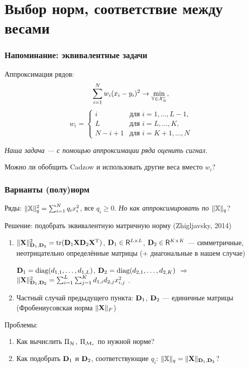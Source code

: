 \documentclass[unicode, notheorems]{beamer}
\begin{document}
\section{Выбор норм, соответствие между весами}
\begin{frame}
\frametitle{Напоминание: эквивалентные задачи}
Аппроксимация рядов:
\begin{equation*}
\sum \limits_{i=1}^N w_i(x_i - y_i)^2 \to \min_{\mathbb{Y} \in \mathcal{X}_N^r},
\end{equation*}
\begin{equation*}
w_i = \begin{cases}
i & \text{для $i = 1, \ldots, L-1,$}\\
L & \text{для $i = L, \ldots, K,$}\\
N - i + 1 & \text{для $i = K + 1, \ldots, N$}
\end{cases}
\end{equation*}

	\vspace{0.4cm}
\textit{Наша задача --- с помощью аппроксимации ряда оценить сигнал.}

	\vspace{0.4cm}
Можно ли обобщить Cadzow и использовать другие веса вместо $w_i$?
\end{frame}

\begin{frame}
	\frametitle{Варианты (полу)норм}
	Ряды:
	$\|\mathbb{X}\|_q^2 = \sum_{i = 1}^N q_i x_i^2$, все $q_i \ge 0$. \textit{Но как аппроксимировать по }$\|\mathbb{X}\|_q$?
	
	\vspace{0.2cm}
	Решение: подобрать эквивалентную матричную норму (Zhigljavsky, 2014)
	
	\begin{enumerate}
		\item $\|\mathbf{X}\|^2_{\mathbf{D}_1, \mathbf{D}_2} = \text{tr}(\mathbf{D}_1 \mathbf{X} \mathbf{D}_2 \mathbf{X}^{\mathrm{T}})$, $\mathbf{D}_1 \in \mathsf{R}^{L \times L}$, $\mathbf{D}_2 \in \mathsf{R}^{K \times K}$ --- симметричные, неотрицательно определённые матрицы (+ диагональные в нашем случае)
		
        $\mathbf{D}_1 = \text{diag}(d_{1, 1}, \ldots, d_{1, L})$, $\mathbf{D}_2 = \text{diag}(d_{2, 1}, \ldots, d_{2, K})$ $\Longrightarrow$ $\|\mathbf{X}\|_{\mathbf{D}_1, \mathbf{D}_2}^2 = \sum_{i = 1}^L \sum_{j = 1}^K d_{1, i} d_{2, j} x_{i, j}^2$	.
		\item Частный случай предыдущего пункта: $\mathbf{D}_1$, $\mathbf{D}_2$ --- единичные матрицы (Фробениусовская норма $\|\mathbf{X}\|_F$)

	\end{enumerate}
	
	\vspace{0.2cm}
	Проблемы:
	\begin{enumerate}
		\item Как вычислить $\Pi_{\mathcal{H}}$, $\Pi_{\mathcal{M}_r}$ по нужной норме?
		\item Как подобрать $\mathbf{D}_1$ и $\mathbf{D}_2$, соответствующие $q_i$: $\|\mathbb{X}\|_q = \|\mathbf{X}\|_{\mathbf{D}_1, \mathbf{D}_2}$?
	\end{enumerate}
\end{frame}
\end{document}
